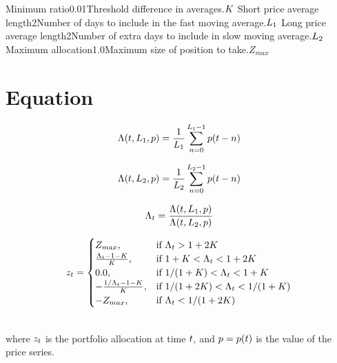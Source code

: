 \documentclass{article}
\begin{document}
\logo
{}
\tblofcontents
{}
{Minimum ratio}{0.01}{Threshold difference in averages.}{$K$}
{Short price average length}{2}{Number of days to include in the fast moving average.}{$L_{1}$}
{Long price average length}{2}{Number of extra days to include in slow moving average.}{$L_{2}$}
{Maximum allocation}{1.0}{Maximum size of position to take.}{$Z_{max}$}
\stoptable

\section{Equation}

\begin{equation}
\Lambda(t, L_{1}, p) = \frac{1}{L_{1}} \sum_{n=0}^{L_{1}-1} p(t - n)\\
\end{equation}

\begin{equation}
\Lambda(t, L_{2}, p) = \frac{1}{L_{2}} \sum_{n=0}^{L_{2}-1} p(t - n)\\
\end{equation}

\begin{equation}
\Lambda_t = \frac{\Lambda(t, L_{1}, p)}{\Lambda(t, L_{2}, p)} \\
\end{equation}

\begin{equation}
z_t = 
\begin{cases} 
\mbox{$Z_{max}$,} & \mbox{if } \Lambda_t > 1 + 2K \\ 
\mbox{$\frac{\Lambda_t - 1 - K}{K}$,} & \mbox{if } 1 + K < \Lambda_t < 1 + 2K \\
\mbox{0.0,} & \mbox{if } 1/(1 + K) < \Lambda_t < 1 + K \\
\mbox{$-\frac{1/\Lambda_t - 1 - K}{K}$,} & \mbox{if } 1/(1 + 2K) < \Lambda_t < 1/(1 + K) \\
\mbox{$-Z_{max}$,} & \mbox{if } \Lambda_t < 1/(1 + 2K) \\
\end{cases}
\end{equation}

\hspace{200mm}
\\
\noindent where $z_t$ is the portfolio allocation at time $t$, and $p = p(t)$ is the value of the price series.

\hspace{200mm}
\hspace{200mm}

\keyterms
\furtherlinks
\end{document}
